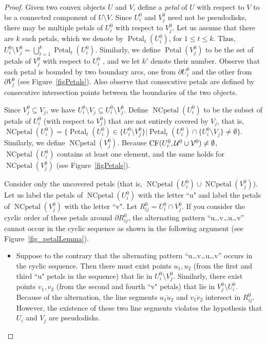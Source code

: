 \documentclass[a4paper,11pt]{article}
\DeclareMathOperator{\petal}{Petal}
\DeclareMathOperator{\NCpetal}{NCpetal}
\DeclareMathOperator{\CF}{CF}
\begin{document}
\begin{proof}

Given two convex   objects $U$ and $V$, define a \emph{petal} of $U$ with respect to $V$ to be a connected component of $U \setminus  V$. 
Since $U_i^0$ and $V_j^0$ need not be pseudodisks, there may be multiple petals of $U_i^0$ with respect to $V_j^0$. 
Let us assume that there are $k$ such petals, which we denote by $\petal_t(U_i^0)$, for $1\leq t\leq k$. 
Thus, $U_i^0 \setminus V_j^0 = \bigcup_{t=1}^k \petal_t(U_i^0)$. Similarly, we define $\petal(V_j^0)$ to be the set of petals of $V_j^0$ with respect to $U_i^0$ , and we let $k'$ denote their number.
Observe that each petal is bounded by two boundary arcs, one from $\partial U_i^0$ and the other from
$\partial V_j^0$ (see Figure~\ref{figPetals}). Also observe that consecutive petals are defined by consecutive intersection points between the boundaries of the two objects. 



Since $V^0_j \subseteq V_j$, we have  ${U^0_i}\setminus V_j \subseteq {U^0_i}\setminus{V^0_j}$.
Define $\NCpetal({U^0_i})$ to be the subset of petals of $U_i^0$ (with respect to $V_j^0$) that are not entirely covered by $V_j$, that is, $\NCpetal({U^0_i})=\{\petal_t({U^0_i})\in \{{U^0_i}\setminus{V^0_j}\}|\petal_t({U^0_i})\cap \{{U^0_i}\setminus V_j\}\neq \emptyset\}$.
Similarly, we define  $\NCpetal({V^0_j})$. 
Because $\CF({U^0_i}, {{\cal U}^0}\cup {{\cal V}^0})\neq \emptyset$, $\NCpetal({U^0_i})$ contains at least one element, and the same holds for $\NCpetal({V^0_j})$ (see Figure~\ref{figPetals}). 




Consider only the uncovered petals (that is, $\NCpetal(U_i^0) \cup \NCpetal(V^0_j)$). Let us label the
petals of $\NCpetal(U_i^0)$ with the letter ``u" and label the petals of $\NCpetal(V^0_j)$ with the letter
``v".  Let $R^0_{ij}={U^0_i}\cap {V^0_j}$. If you consider the cyclic order of these petals around $\partial R^0_{ij}$, 
the alternating pattern ``u\dots v\dots u\dots v” cannot occur in the cyclic sequence as shown in the following argument (see Figure~\ref{fig_petalLemma}).

\begin{itemize}
    \item[] 
Suppose to the contrary that the alternating pattern ``u\dots v\dots u\dots v” occurs in the cyclic sequence. Then there must exist points $u_1,u_2$ (from the first and third ``u" petals in the sequence) that lie
in $U_i^0 \setminus V^0_j$. Similarly, there exist points $v_1, v_2$ (from the second and fourth ``v" petals) that lie in $V^0_j \setminus U_i^0$. 
  Because of the alternation, the line segments
 $\overline{u_1u_2}$ and $\overline{v_1v_2}$ intersect in $R^0_{ij}$. 
However, the existence of these two line segments violates the hypothesis that $U_i$ and $V_j$ are pseudodisks.
\end{itemize}


\end{proof}
\end{document}
